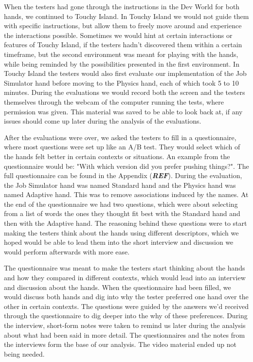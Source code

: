 When the testers had gone through the instructions in the Dev World for both hands, we continued to Touchy Island. In Touchy Island we would not guide them with specific instructions, but allow them to freely move around and experience the interactions possible. Sometimes we would hint at certain interactions or features of Touchy Island, if the testers hadn't discovered them within a certain timeframe, but the second environment was meant for playing with the hands, while being reminded by the possibilities presented in the first environment. In Touchy Island the testers would also first evaluate our implementation of the Job Simulator hand before moving to the Physics hand, each of which took 5 to 10 minutes. During the evaluations we would record both the screen and the testers themselves through the webcam of the computer running the tests, where permission was given. This material was saved to be able to look back at, if any issues should come up later during the analysis of the evaluations.

After the evaluations were over, we asked the testers to fill in a questionnaire, where most questions were set up like an A/B test. They would select which of the hands felt better in certain contexts or situations. An example from the questionnaire would be: "With which version did you prefer pushing things?". The full questionnaire can be found in the Appendix (\textbf{\textit{REF}}). During the evaluation, the Job Simulator hand was named Standard hand and the Physics hand was named Adaptive hand. This was to remove associations induced by the names. At the end of the questionnaire we had two questions, which were about selecting from a list of words the ones they thought fit best with the Standard hand and then with the Adaptive hand. The reasoning behind these questions were to start making the testers think about the hands using different descriptors, which we hoped would be able to lead them into the short interview and discussion we would perform afterwards with more ease.

The questionnaire was meant to make the testers start thinking about the hands and how they compared in different contexts, which would lead into an interview and discussion about the hands. When the questionnaire had been filled, we would discuss both hands and dig into why the tester preferred one hand over the other in certain contexts. The questions were guided by the answers we'd received through the questionnaire to dig deeper into the why of these preferences. During the interview, short-form notes were taken to remind us later during the analysis about what had been said in more detail. The questionnaires and the notes from the interviews form the base of our analysis. The video material ended up not being needed.


